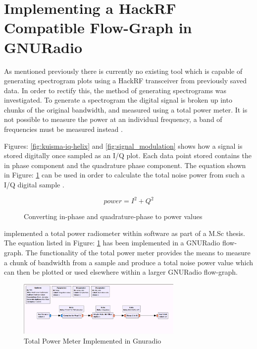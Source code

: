 \documentclass[runningheads,a4paper]{llncs}
\begin{document}
\newpage
\section*{Implementing a HackRF Compatible Flow-Graph in GNURadio}

As mentioned previously there is currently no existing tool which is capable of generating spectrogram plots using a HackRF transceiver from previously saved data. In order to rectify this, the method of generating spectrograms was investigated. To generate a spectrogram the digital signal is broken up into chunks of the original bandwidth, and measured using a total power meter. It is not possible to measure the power at an individual frequency, a band of frequencies must be measured instead \citep{keen-15}.

Figures: \ref{fig:kuisma-iq-helix} and \ref{fig:signal_modulation} shows how a signal is stored digitally once sampled as an I/Q plot. Each data point stored contains the in phase component and the quadrature phase component. The equation shown in Figure: \ref{fig:power_formula} can be used in order to calculate the total noise power from such a I/Q digital sample \citep{nelson-15}.

%
\begin{figure}[here]
	\centering
	\begin{equation}
	power = I^2 + Q^2
	\end{equation}
	\caption{Converting in-phase and quadrature-phase to power values}
	\label{fig:power_formula}
\end{figure}
%

\citet{nelson-15} implemented a total power radiometer within software as part of a M.Sc thesis. The equation listed in Figure: \ref{fig:power_formula} has been implemented in a GNURadio flow-graph. The functionality of the total power meter provides the means to measure a chunk of bandwidth from a sample and produce a total noise power value which can then be plotted or used elsewhere within a larger GNURadio flow-graph.

%
\begin{figure}[!htb]
	\centering
	\includegraphics[width=8cm]{images/17}
	\caption{Total Power Meter Implemented in Gnuradio \citep{nelson-15}}
	\label{fig:sdr_square_law_detector} 
\end{figure}
%
\end{document}
